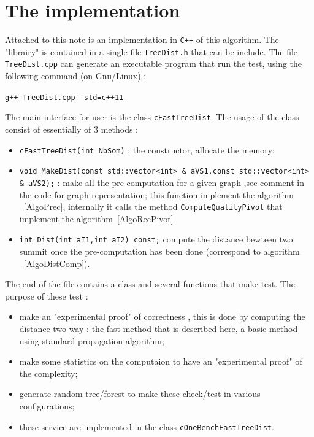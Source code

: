\documentclass[a4paper]{article}
\begin{document}
\section{The implementation}

Attached to this note is an implementation in {\tt C++} of this algorithm.
The "librairy" is contained in a single file {\tt TreeDist.h} that can be include.
The file {\tt TreeDist.cpp} can generate an executable program that run the test,
using the following command (on Gnu/Linux) :

{\tt g++ TreeDist.cpp  -std=c++11}


The main interface for user is the class {\tt cFastTreeDist}. The usage of the class
consist of essentially of $3$ methods :

\begin{itemize}
   \item {\tt cFastTreeDist(int NbSom)} : the constructor, allocate the memory;


   \item {\tt void MakeDist(const std::vector<int> \& aVS1,const std::vector<int> \& aVS2);} : make all the
         pre-computation for a given graph ,see comment in the code for graph representation;
         this function implement the algorithm ~\ref{AlgoPrec}, internally it calls the 
        method {\tt ComputeQualityPivot} that implement the algorithm~\ref{AlgoRecPivot}

   \item {\tt int Dist(int aI1,int aI2) const;}   compute the distance bewteen two summit once
        the pre-computation has been done (correspond to algorithm ~\ref{AlgoDistComp}).
\end{itemize}

The end of the file contains a class and several functions that make test. The purpose of these
test :

\begin{itemize}
   \item make an "experimental proof"  of  correctness , this is done by computing
       the distance two way : the fast method that is described here, a basic method
       using standard propagation algorithm; 

   \item make some statistics on the computaion to have an "experimental proof" of the complexity;

   \item generate random tree/forest to make these check/test in various configurations;
  
   \item these service are implemented in the class {\tt cOneBenchFastTreeDist}.
\end{itemize}
\end{document}
